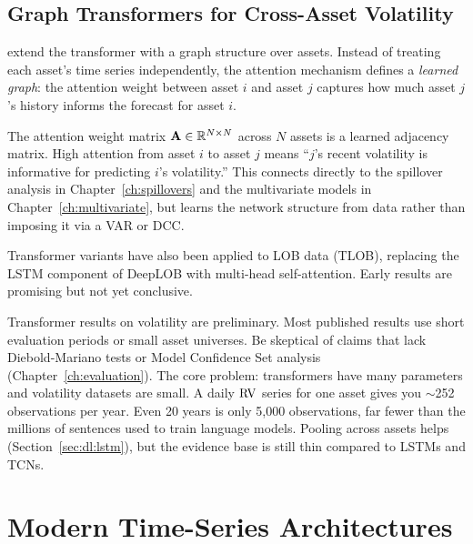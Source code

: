 \subsection{Graph Transformers for Cross-Asset Volatility}

\citet{ChenRobert2022} extend the transformer with a graph structure over assets.
Instead of treating each asset's time series independently, the attention mechanism defines a \emph{learned graph}: the attention weight between asset $i$ and asset $j$ captures how much asset $j$'s history informs the forecast for asset $i$.

\begin{keyidea}
The attention weight matrix $\mathbf{A} \in \mathbb{R}^{N \times N}$ across $N$ assets is a learned adjacency matrix.
High attention from asset $i$ to asset $j$ means ``$j$'s recent volatility is informative for predicting $i$'s volatility.''
This connects directly to the spillover analysis in Chapter~\ref{ch:spillovers} and the multivariate models in Chapter~\ref{ch:multivariate}, but learns the network structure from data rather than imposing it via a VAR or DCC.
\end{keyidea}

Transformer variants have also been applied to LOB data (TLOB), replacing the LSTM component of DeepLOB with multi-head self-attention.
Early results are promising but not yet conclusive.

\begin{warning}
Transformer results on volatility are preliminary.
Most published results use short evaluation periods or small asset universes.
Be skeptical of claims that lack Diebold-Mariano tests or Model Confidence Set analysis (Chapter~\ref{ch:evaluation}).
The core problem: transformers have many parameters and volatility datasets are small.
A daily $\operatorname{RV}$ series for one asset gives you $\sim$252 observations per year.
Even 20 years is only 5,000 observations, far fewer than the millions of sentences used to train language models.
Pooling across assets helps (Section~\ref{sec:dl:lstm}), but the evidence base is still thin compared to LSTMs and TCNs.
\end{warning}


\section{Modern Time-Series Architectures}\label{sec:dl:modern}


